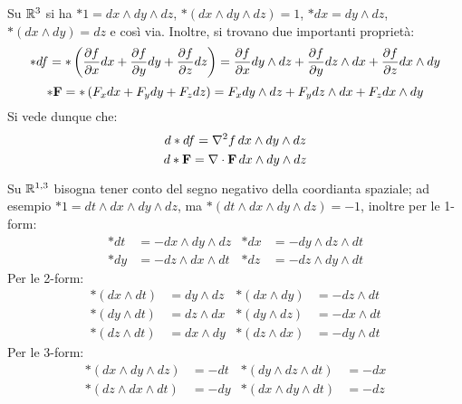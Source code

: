 \begin{example}
	Su $ \mathbb{R}^3 $ si ha $ *1 = dx \wedge dy \wedge dz $, $ * \left( dx \wedge dy \wedge dz \right) = 1 $, $ *dx = dy \wedge dz $, $ * \left( dx \wedge dy \right) = dz $ e così via. Inoltre, si trovano due importanti proprietà:
	\begin{equation*}
		*df = * \left( \frac{\partial f}{\partial x}dx + \frac{\partial f}{\partial y}dy + \frac{\partial f}{\partial z}dz \right) = \frac{\partial f}{\partial x} dy \wedge dz + \frac{\partial f}{\partial y} dz \wedge dx + \frac{\partial f}{\partial z} dx \wedge dy
	\end{equation*}
	\begin{equation*}
		*\mathbf{F} = * \left( F_x dx + F_y dy + F_z dz \right) = F_x dy \wedge dz + F_y dz \wedge dx + F_z dx \wedge dy
	\end{equation*}
	Si vede dunque che:
	\begin{equation}
		d*df = \nabla^2 f \, dx \wedge dy \wedge dz
		\label{eq:3.19}
	\end{equation}
	\begin{equation}
		d*\mathbf{F} = \nabla\cdot\mathbf{F} \, dx \wedge dy \wedge dz
		\label{eq:3.20}
	\end{equation}
\end{example}
\begin{example}
	Su $ \mathbb{R}^{1,3} $ bisogna tener conto del segno negativo della coordianta spaziale; ad esempio $ *1 = dt \wedge dx \wedge dy \wedge dz $, ma $ * \left( dt \wedge dx \wedge dy \wedge dz \right) = -1 $, inoltre per le 1-form:
	\begin{align*}
		*dt &= - dx \wedge dy \wedge dz & *dx &= - dy \wedge dz \wedge dt \\
		*dy &= - dz \wedge dx \wedge dt & *dz &= - dz \wedge dy \wedge dt
	\end{align*}
	Per le 2-form:
	\begin{align*}
		*(dx \wedge dt) &= dy \wedge dz & *(dx \wedge dy) &= - dz \wedge dt \\
		*(dy \wedge dt) &= dz \wedge dx & *(dy \wedge dz) &= - dx \wedge dt \\
		*(dz \wedge dt) &= dx \wedge dy & *(dz \wedge dx) &= - dy \wedge dt
	\end{align*}
	Per le 3-form:
	\begin{align*}
		*(dx \wedge dy \wedge dz) &= - dt & *(dy \wedge dz \wedge dt) &= -dx \\
		*(dz \wedge dx \wedge dt) &= - dy & *(dx \wedge dy \wedge dt) &= -dz
	\end{align*}
\end{example}










